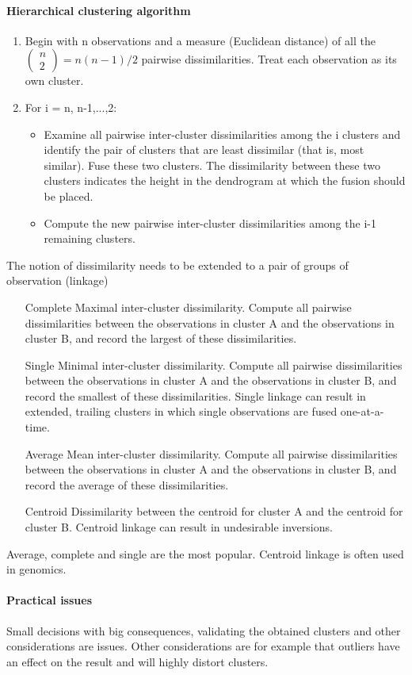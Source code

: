 \documentclass[../document.tex]{subfiles}
\begin{document}
	\paragraph{Hierarchical clustering algorithm}
	\begin{enumerate}
		\item Begin with n observations and a measure (Euclidean distance) of all the
		\(
		\begin{pmatrix}
			n\\2
		\end{pmatrix} = n(n-1)/2
		\)
		 pairwise dissimilarities. Treat each observation as its own cluster.
		\item For i = n, n-1,...,2:
		\begin{itemize}
			\item Examine all pairwise inter-cluster dissimilarities among the i clusters and identify the pair of clusters that are least dissimilar (that is, most similar). Fuse these two clusters. The dissimilarity between these two clusters indicates the height in the dendrogram at which the fusion should be placed.
			\item Compute the new pairwise inter-cluster dissimilarities among the i-1 remaining clusters.
		\end{itemize}
	\end{enumerate}
	The notion of dissimilarity needs to be extended to a pair of groups of observation (linkage)
	\begin{itemize}
		\item [Complete] Maximal inter-cluster dissimilarity. Compute all pairwise dissimilarities between the observations in cluster A and the observations in cluster B, and record the largest of these dissimilarities.
		\item [Single] Minimal inter-cluster dissimilarity. Compute all pairwise dissimilarities between the observations in cluster A and the observations in cluster B, and record the smallest of these dissimilarities. Single linkage can result in extended, trailing clusters in which single observations are fused one-at-a-time.
		\item [Average] Mean inter-cluster dissimilarity. Compute all pairwise dissimilarities between the observations in cluster A and the observations in cluster B, and record the average of these dissimilarities.
		\item [Centroid] Dissimilarity between the centroid for cluster A and the centroid for cluster B. Centroid linkage can result in undesirable inversions.
	\end{itemize}
	Average, complete and single are the most popular. Centroid linkage is often used in genomics.

	\paragraph{Practical issues}
	Small decisions with big consequences, validating the obtained clusters and other considerations are issues. Other considerations are for example that outliers have an effect on the result and will highly distort clusters.
\end{document}
